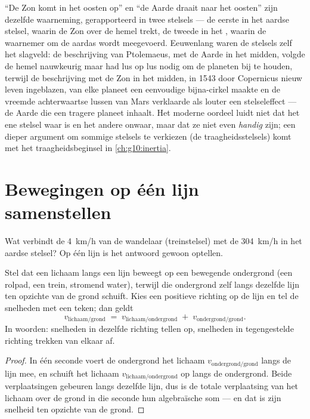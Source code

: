 \begin{remark}\label{rem:g10:relative-motion:history}
``De Zon komt in het oosten op'' en ``de Aarde draait naar het oosten''
zijn dezelfde waarneming, gerapporteerd in twee stelsels --- de eerste in
het aardse stelsel, waarin de Zon over de hemel trekt, de tweede in het
, waarin de waarnemer om de aardas wordt meegevoerd.
Eeuwenlang waren de stelsels zelf het slagveld: de beschrijving van
Ptolemaeus, met de Aarde in het midden, volgde de hemel nauwkeurig maar
had lus op lus nodig om de planeten bij te houden, terwijl de
beschrijving met de Zon in het midden, in 1543 door Copernicus nieuw
leven ingeblazen, van elke planeet een eenvoudige bijna-cirkel maakte en
de vreemde achterwaartse lussen van Mars verklaarde als louter een
stelseleffect --- de Aarde die een tragere planeet inhaalt. Het moderne
oordeel luidt niet dat het ene stelsel waar is en het andere onwaar, maar
dat ze niet even \emph{handig} zijn; een dieper argument om sommige
stelsels te verkiezen (de traagheidsstelsels) komt met het
traagheidsbeginsel in \cref{ch:g10:inertia}.
\end{remark}

\section{Bewegingen op één lijn samenstellen}

Wat verbindt de \qty{4}{km/h} van de wandelaar (treinstelsel) met de
\qty{304}{km/h} in het aardse stelsel? Op één lijn is het antwoord
gewoon optellen.

\begin{proposition}\label{prop:g10:relative-motion:compose}
Stel dat een lichaam langs een lijn beweegt op een bewegende ondergrond
(een rolpad, een trein, stromend water), terwijl die ondergrond zelf
langs dezelfde lijn ten opzichte van de grond schuift. Kies een positieve
richting op de lijn en tel de snelheden met een teken; dan geldt
\[
v_{\text{lichaam/grond}} \;=\; v_{\text{lichaam/ondergrond}} \;+\;
v_{\text{ondergrond/grond}} .
\]
In woorden: snelheden in dezelfde richting tellen op, snelheden in
tegengestelde richting trekken van elkaar af.
\end{proposition}

\begin{proof}
In één seconde voert de ondergrond het lichaam
$v_{\text{ondergrond/grond}}$  langs de lijn mee, en schuift het
lichaam $v_{\text{lichaam/ondergrond}}$  op langs de ondergrond.
Beide verplaatsingen gebeuren langs dezelfde lijn, dus is de totale
verplaatsing van het lichaam over de grond in die seconde hun
algebraïsche som --- en dat is zijn snelheid ten opzichte van de grond.
\end{proof}


